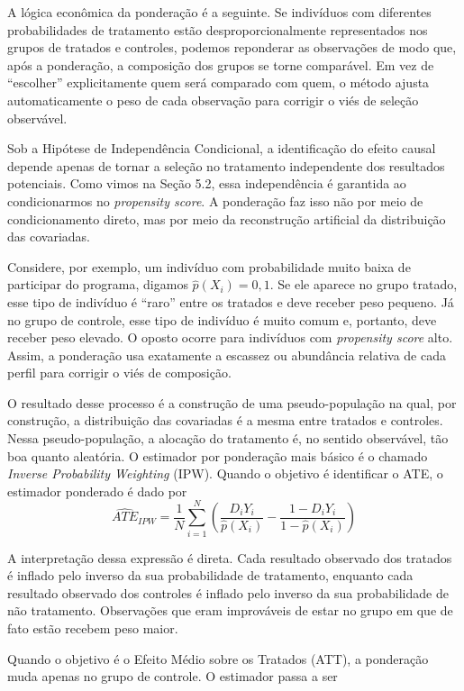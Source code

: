 A lógica econômica da ponderação é a seguinte. Se indivíduos com diferentes probabilidades de tratamento estão desproporcionalmente representados nos grupos de tratados e controles, podemos reponderar as observações de modo que, após a ponderação, a composição dos grupos se torne comparável. Em vez de “escolher” explicitamente quem será comparado com quem, o método ajusta automaticamente o peso de cada observação para corrigir o viés de seleção observável.

Sob a Hipótese de Independência Condicional, a identificação do efeito causal depende apenas de tornar a seleção no tratamento independente dos resultados potenciais. Como vimos na Seção 5.2, essa independência é garantida ao condicionarmos no \textit{propensity score}. A ponderação faz isso não por meio de condicionamento direto, mas por meio da reconstrução artificial da distribuição das covariadas.

Considere, por exemplo, um indivíduo com probabilidade muito baixa de participar do programa, digamos $\hat{p}(X_i) = 0,1$. Se ele aparece no grupo tratado, esse tipo de indivíduo é “raro” entre os tratados e deve receber peso pequeno. Já no grupo de controle, esse tipo de indivíduo é muito comum e, portanto, deve receber peso elevado. O oposto ocorre para indivíduos com \textit{propensity score} alto. Assim, a ponderação usa exatamente a escassez ou abundância relativa de cada perfil para corrigir o viés de composição.

O resultado desse processo é a construção de uma pseudo-população na qual, por construção, a distribuição das covariadas é a mesma entre tratados e controles. Nessa pseudo-população, a alocação do tratamento é, no sentido observável, tão boa quanto aleatória. O estimador por ponderação mais básico é o chamado \textit{Inverse Probability Weighting} (IPW). Quando o objetivo é identificar o ATE, o estimador ponderado é dado por
$$
\widehat{ATE}_{IPW} = \frac{1}{N} \sum_{i=1}^{N}\left(\frac{D_i Y_i}{\hat{p}(X_i)} - \frac{1- D_iY_i}{1-\hat{p}(X_i)}\right)
$$

A interpretação dessa expressão é direta. Cada resultado observado dos tratados é inflado pelo inverso da sua probabilidade de tratamento, enquanto cada resultado observado dos controles é inflado pelo inverso da sua probabilidade de não tratamento. Observações que eram improváveis de estar no grupo em que de fato estão recebem peso maior.

Quando o objetivo é o Efeito Médio sobre os Tratados (ATT), a ponderação muda apenas no grupo de controle. O estimador passa a ser

